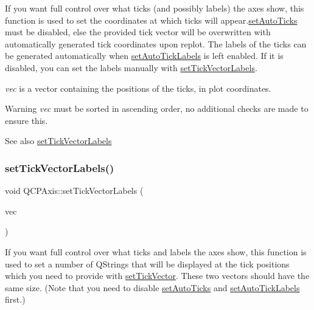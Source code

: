 If you want full control over what ticks (and possibly labels) the axes show, this function is used to set the coordinates at which ticks will appear.\mbox{\hyperlink{class_q_c_p_axis_ae867c23d3a6a7bd4d09cc66c5d018f63}{set\+Auto\+Ticks}} must be disabled, else the provided tick vector will be overwritten with automatically generated tick coordinates upon replot. The labels of the ticks can be generated automatically when \mbox{\hyperlink{class_q_c_p_axis_aaa47e3a6bac0c20d4beb9028f01bc1a1}{set\+Auto\+Tick\+Labels}} is left enabled. If it is disabled, you can set the labels manually with \mbox{\hyperlink{class_q_c_p_axis_a921d3ba3853ca3bd2cce3459f7a243ed}{set\+Tick\+Vector\+Labels}}.

{\itshape vec} is a vector containing the positions of the ticks, in plot coordinates.

\begin{DoxyWarning}{Warning}
{\itshape vec} must be sorted in ascending order, no additional checks are made to ensure this.
\end{DoxyWarning}
\begin{DoxySeeAlso}{See also}
\mbox{\hyperlink{class_q_c_p_axis_a921d3ba3853ca3bd2cce3459f7a243ed}{set\+Tick\+Vector\+Labels}} 
\end{DoxySeeAlso}
\mbox{\label{class_q_c_p_axis_a921d3ba3853ca3bd2cce3459f7a243ed}} 
\subsubsection{\texorpdfstring{set\+Tick\+Vector\+Labels()}{setTickVectorLabels()}}
{\footnotesize\ttfamily void Q\+C\+P\+Axis\+::set\+Tick\+Vector\+Labels (\begin{DoxyParamCaption}\item[{const Q\+Vector$<$ Q\+String $>$ \&}]{vec }\end{DoxyParamCaption})}

If you want full control over what ticks and labels the axes show, this function is used to set a number of Q\+Strings that will be displayed at the tick positions which you need to provide with \mbox{\hyperlink{class_q_c_p_axis_a871db94c5d796c80fcbe1a9d4506e27e}{set\+Tick\+Vector}}. These two vectors should have the same size. (Note that you need to disable \mbox{\hyperlink{class_q_c_p_axis_ae867c23d3a6a7bd4d09cc66c5d018f63}{set\+Auto\+Ticks}} and \mbox{\hyperlink{class_q_c_p_axis_aaa47e3a6bac0c20d4beb9028f01bc1a1}{set\+Auto\+Tick\+Labels}} first.)

